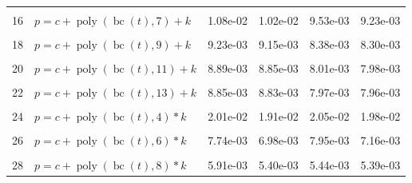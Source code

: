 \documentclass[12pt,a4paper]{article}
\DeclareMathOperator{\bc}{bc}
\DeclareMathOperator{\poly}{poly}
\begin{document}
\begin{longtable}[t]{ll>{\raggedleft\arraybackslash}p{2cm}>{\raggedleft\arraybackslash}p{2cm}>{\raggedleft\arraybackslash}p{2cm}>{\raggedleft\arraybackslash}p{2cm}}
\cellcolor{gray!6}{15} & \cellcolor{gray!6}{$p = c + \poly\left( \bc(t), 6 \right) + k$} & \cellcolor{gray!6}{1.11e-02} & \cellcolor{gray!6}{1.05e-02} & \cellcolor{gray!6}{1.03e-02} & \cellcolor{gray!6}{9.70e-03}\\
16 & $p = c + \poly\left( \bc(t), 7 \right) + k$ & 1.08e-02 & 1.02e-02 & 9.53e-03 & 9.23e-03\\
\cellcolor{gray!6}{17} & \cellcolor{gray!6}{$p = c + \poly\left( \bc(t), 8 \right) + k$} & \cellcolor{gray!6}{9.86e-03} & \cellcolor{gray!6}{9.53e-03} & \cellcolor{gray!6}{8.48e-03} & \cellcolor{gray!6}{8.45e-03}\\
18 & $p = c + \poly\left( \bc(t), 9 \right) + k$ & 9.23e-03 & 9.15e-03 & 8.38e-03 & 8.30e-03\\
\cellcolor{gray!6}{19} & \cellcolor{gray!6}{$p = c + \poly\left( \bc(t), 10 \right) + k$} & \cellcolor{gray!6}{8.97e-03} & \cellcolor{gray!6}{8.93e-03} & \cellcolor{gray!6}{8.03e-03} & \cellcolor{gray!6}{8.01e-03}\\
20 & $p = c + \poly\left( \bc(t), 11 \right) + k$ & 8.89e-03 & 8.85e-03 & 8.01e-03 & 7.98e-03\\
\cellcolor{gray!6}{21} & \cellcolor{gray!6}{$p = c + \poly\left( \bc(t), 12 \right) + k$} & \cellcolor{gray!6}{8.88e-03} & \cellcolor{gray!6}{8.84e-03} & \cellcolor{gray!6}{7.99e-03} & \cellcolor{gray!6}{7.97e-03}\\
22 & $p = c + \poly\left( \bc(t), 13 \right) + k$ & 8.85e-03 & 8.83e-03 & 7.97e-03 & 7.96e-03\\
\cellcolor{gray!6}{23} & \cellcolor{gray!6}{$p = c + \poly\left( \bc(t), 3 \right) * k$} & \cellcolor{gray!6}{3.33e-02} & \cellcolor{gray!6}{2.04e-02} & \cellcolor{gray!6}{2.18e-02} & \cellcolor{gray!6}{2.03e-02}\\
24 & $p = c + \poly\left( \bc(t), 4 \right) * k$ & 2.01e-02 & 1.91e-02 & 2.05e-02 & 1.98e-02\\
\cellcolor{gray!6}{25} & \cellcolor{gray!6}{$p = c + \poly\left( \bc(t), 5 \right) * k$} & \cellcolor{gray!6}{1.72e-02} & \cellcolor{gray!6}{1.67e-02} & \cellcolor{gray!6}{1.45e-02} & \cellcolor{gray!6}{1.42e-02}\\
26 & $p = c + \poly\left( \bc(t), 6 \right) * k$ & 7.74e-03 & 6.98e-03 & 7.95e-03 & 7.16e-03\\
\cellcolor{gray!6}{27} & \cellcolor{gray!6}{$p = c + \poly\left( \bc(t), 7 \right) * k$} & \cellcolor{gray!6}{7.29e-03} & \cellcolor{gray!6}{6.46e-03} & \cellcolor{gray!6}{6.77e-03} & \cellcolor{gray!6}{6.41e-03}\\
28 & $p = c + \poly\left( \bc(t), 8 \right) * k$ & 5.91e-03 & 5.40e-03 & 5.44e-03 & 5.39e-03\\

\end{longtable}
\end{document}
